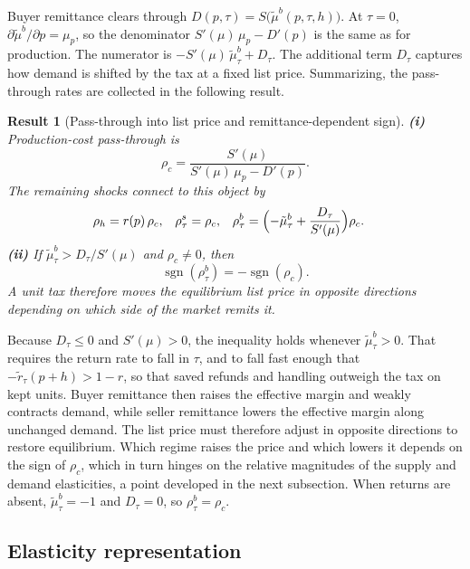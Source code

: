 \documentclass[11pt]{article}
\newtheorem{result}{Result}
\begin{document}
Buyer remittance clears through
$D(p,\tau)=S\bigl(\tilde{\mu}^{b}(p,\tau,h)\bigr)$.  At
$\tau=0$, $\partial\tilde{\mu}^{b}/\partial p=\mu_p$, so the denominator
$S'(\mu)\,\mu_p-D'(p)$ is the same as for production.  The numerator is
$-S'(\mu)\,\tilde{\mu}^{b}_{\tau}+D_{\tau}$.  The additional term $D_{\tau}$
captures how demand is shifted by the tax at a fixed list price.
Summarizing, the pass-through rates are collected in the following result.
\begin{result}[Pass-through into list price and remittance-dependent sign]
\label{res:pass-through}
  \textbf{(i)} Production-cost pass-through is
  \begin{equation}
    \rho_c
    = \frac{S'(\mu)}{S'(\mu)\,\mu_p-D'(p)}.
    \label{eq:rho-c}
  \end{equation}
  The remaining shocks connect to this object by
  \begin{align}
    \rho_h &= r(p)\,\rho_c,
    &
    \rho^{s}_{\tau} &= \rho_c,
    &
    \rho^{b}_{\tau}
    &= \Bigl(-\tilde{\mu}^{b}_{\tau}+\frac{D_{\tau}}{S'(\mu)}\Bigr)\rho_c.
    \label{eq:rho-links}
  \end{align}
  \textbf{(ii)} If $\tilde{\mu}^{b}_{\tau}>D_{\tau}/S'(\mu)$ and
  $\rho_c\neq 0$, then
  \[
  \operatorname{sgn}(\rho^{b}_{\tau})=-\operatorname{sgn}(\rho_c).
  \]
  A unit tax therefore moves the equilibrium list price in opposite
  directions depending on which side of the market remits it.
\end{result}
Because $D_{\tau}\le 0$ and $S'(\mu)>0$, the inequality holds whenever
$\tilde{\mu}^{b}_{\tau}>0$.  That requires the return rate to fall in
$\tau$, and to fall fast enough that $-\tilde{r}_{\tau}(p+h)>1-r$, so that
saved refunds and handling outweigh the tax on kept units.  Buyer
remittance then raises the effective margin and weakly contracts demand,
while seller remittance lowers the effective margin along unchanged demand.
The list price must therefore adjust in opposite directions to restore
equilibrium.  Which regime raises the price and which lowers it depends on
the sign of $\rho_c$, which in turn hinges on the relative magnitudes of the
supply and demand elasticities, a point developed in the next subsection.
When returns are absent, $\tilde{\mu}^{b}_{\tau}=-1$ and $D_{\tau}=0$, so
$\rho^{b}_{\tau}=\rho_c$.

\subsection{Elasticity representation}
\end{document}
